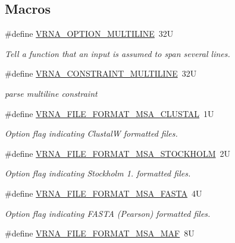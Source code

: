 \subsection*{Macros}
\begin{DoxyCompactItemize}
\item 
\#define \hyperlink{group__file__utils_gabec89c09874528c6cb73140a4c3d86d7}{V\+R\+N\+A\+\_\+\+O\+P\+T\+I\+O\+N\+\_\+\+M\+U\+L\+T\+I\+L\+I\+NE}~32U
\begin{DoxyCompactList}\small\item\em Tell a function that an input is assumed to span several lines. \end{DoxyCompactList}\item 
\#define \hyperlink{group__file__utils_ga7d725ef525b29891abef3f1ed42599a4}{V\+R\+N\+A\+\_\+\+C\+O\+N\+S\+T\+R\+A\+I\+N\+T\+\_\+\+M\+U\+L\+T\+I\+L\+I\+NE}~32U
\begin{DoxyCompactList}\small\item\em parse multiline constraint \end{DoxyCompactList}\item 
\#define \hyperlink{group__file__utils_ga79a23de2c7249f2cccd762e475c81859}{V\+R\+N\+A\+\_\+\+F\+I\+L\+E\+\_\+\+F\+O\+R\+M\+A\+T\+\_\+\+M\+S\+A\+\_\+\+C\+L\+U\+S\+T\+AL}~1U
\begin{DoxyCompactList}\small\item\em Option flag indicating ClustalW formatted files. \end{DoxyCompactList}\item 
\#define \hyperlink{group__file__utils_ga62be992445cd8ab2ad7a8fded944338b}{V\+R\+N\+A\+\_\+\+F\+I\+L\+E\+\_\+\+F\+O\+R\+M\+A\+T\+\_\+\+M\+S\+A\+\_\+\+S\+T\+O\+C\+K\+H\+O\+LM}~2U
\begin{DoxyCompactList}\small\item\em Option flag indicating Stockholm 1. formatted files. \end{DoxyCompactList}\item 
\#define \hyperlink{group__file__utils_gacf6274a2c825f34e4131404665b00604}{V\+R\+N\+A\+\_\+\+F\+I\+L\+E\+\_\+\+F\+O\+R\+M\+A\+T\+\_\+\+M\+S\+A\+\_\+\+F\+A\+S\+TA}~4U
\begin{DoxyCompactList}\small\item\em Option flag indicating F\+A\+S\+TA (Pearson) formatted files. \end{DoxyCompactList}\item 
\#define \hyperlink{group__file__utils_gab3186d774c01570d2a47d0308eec4927}{V\+R\+N\+A\+\_\+\+F\+I\+L\+E\+\_\+\+F\+O\+R\+M\+A\+T\+\_\+\+M\+S\+A\+\_\+\+M\+AF}~8U

\end{DoxyCompactItemize}
